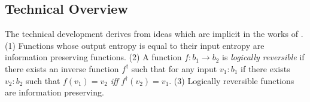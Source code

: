 \documentclass{article}
\begin{document}
\subsection{Technical Overview}

The technical development derives from ideas which are implicit in the
works of \cite{toffoli:1980, Zuliani:2001:LR,
  malacaria2007assessing,ClarkHM07,Ghica:2007:GSS:1190216.1190269}.
(1) Functions whose output entropy is equal to their input entropy are
information preserving functions.  (2) A function
$f : b_1 \rightarrow b_2$ is \emph{logically reversible} if there
exists an inverse function $f^{\dagger}$ such that for any input
$v_1:b_1$ if there exists $v_2:b_2$ such that $f(v_1)=v_2$ \emph{iff}
$f^{\dagger}(v_2)=v_1$.  (3) Logically reversible functions are
information preserving.
\end{document}
